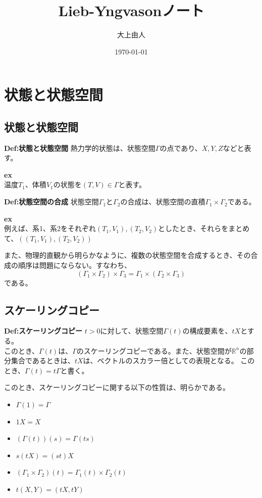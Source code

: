 \documentclass[a4paper,11pt]{jsarticle}
\numberwithin{equation}{section}
\begin{document}
\title{Lieb-Yngvasonノート}
\author{大上由人}
\date{\today}
\maketitle
\tableofcontents
\newpage
\section{状態と状態空間}
\subsection{状態と状態空間}
\begin{itembox}[l]{\textbf{Def:状態と状態空間}}
熱力学的状態は、状態空間$\Gamma$の点であり、$X,Y,Z$などと表す。
\end{itembox}
\textbf{ex}\\
温度$T_1$、体積$V_1$の状態を$(T,V) \in \Gamma$と表す。

\begin{itembox}[l]{\textbf{Def:状態空間の合成}}
    状態空間$\Gamma_1$と$\Gamma_2$の合成は、状態空間の直積$\Gamma_1 \times \Gamma_2$である。
\end{itembox}
\textbf{ex}\\
例えば、系1、系2をそれぞれ$(T_1,V_1),(T_2,V_2)$としたとき、それらをまとめて、$((T_1,V_1),(T_2,V_2))$

また、物理的直観から明らかなように、複数の状態空間を合成するとき、その合成の順序は問題にならない。すなわち、
\begin{equation}
    (\Gamma_1 \times \Gamma_2) \times \Gamma_3 = \Gamma_1 \times (\Gamma_2 \times \Gamma_3)
\end{equation}
である。

\subsection{スケーリングコピー}
\begin{itembox}[l]{\textbf{Def:スケーリングコピー}}
    $t>0$に対して、状態空間$\Gamma(t)$の構成要素を、$tX$とする。\\
    このとき、$\Gamma(t)$は、$\Gamma$のスケーリングコピーである。また、状態空間が$\mathbb{R}^n$の部分集合であるときは、$tX$は、ベクトルのスカラー倍としての表現となる。
    このとき、$\Gamma(t)=t\Gamma$と書く。
\end{itembox}
このとき、スケーリングコピーに関する以下の性質は、明らかである。
\begin{itemize}
    \item $\Gamma(1)=\Gamma$
    \item $1X=X$
    \item $(\Gamma(t))(s)=\Gamma(ts)$
    \item $s(tX)=(st)X$
    \item $(\Gamma_1 \times \Gamma_2)(t)=\Gamma_1(t) \times \Gamma_2(t)$
    \item $t(X,Y)=(tX,tY)$
\end{itemize}
\end{document}
